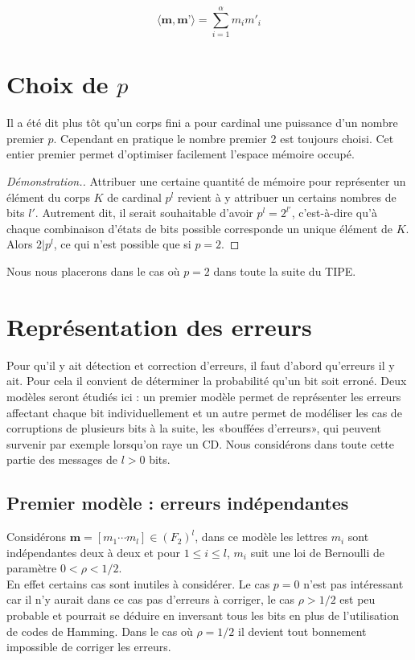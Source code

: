 \documentclass[10pt]{article}
\begin{document}
\begin{displaymath}
\langle \textbf{m}, \textbf{m'} \rangle = \sum_{i=1}^{\alpha} m_i m'_i
\end{displaymath}



\section{Choix de $p$}
Il a été dit plus tôt qu'un corps fini a pour cardinal une puissance d'un nombre premier $p$. Cependant en pratique le nombre premier 2 est toujours choisi. Cet entier premier permet d'optimiser facilement l'espace mémoire occupé.

\begin{proof}[Démonstration.]
Attribuer une certaine quantité de mémoire pour représenter un élément du corps $K$ de cardinal $p^l$ revient à y attribuer un certains nombres de bits $l'$.
Autrement dit, il serait souhaitable d'avoir $p^l = 2^{l'}$, c'est-à-dire qu'à chaque combinaison d'états de bits possible corresponde un unique élément de $K$. Alors $2 | p^l$, ce qui n'est possible que si $p=2$.
\end{proof}

Nous nous placerons dans le cas où $p=2$ dans toute la suite du TIPE.

\section{Représentation des erreurs}
Pour qu'il y ait détection et correction d'erreurs, il faut d'abord qu'erreurs il y ait. Pour cela il convient de déterminer la probabilité qu'un bit soit erroné. Deux modèles seront étudiés ici : un premier modèle permet de représenter les erreurs affectant chaque bit individuellement et un autre permet de modéliser les cas de corruptions de plusieurs bits à la suite, les «bouffées d'erreurs», qui peuvent survenir par exemple lorsqu'on raye un CD. Nous considérons dans toute cette partie des messages de $l>0$ bits.

\subsection{Premier modèle : erreurs indépendantes}

Considérons $\textbf{m}=[m_1 \cdots m_l] \in (F_2)^l$, dans ce modèle les lettres $m_i$ sont indépendantes deux à deux et pour $1 \leq i \leq l$, $m_i$ suit une loi de Bernoulli de paramètre $0<\rho<1/2$.\\
En effet certains cas sont inutiles à considérer. Le cas $p=0$ n'est pas intéressant car il n'y aurait dans ce cas pas d'erreurs à corriger, le cas $\rho > 1/2$ est peu probable et pourrait se déduire en inversant tous les bits en plus de l'utilisation de codes de Hamming. Dans le cas où $\rho=1/2$ il devient tout bonnement impossible de corriger les erreurs.
\end{document}
